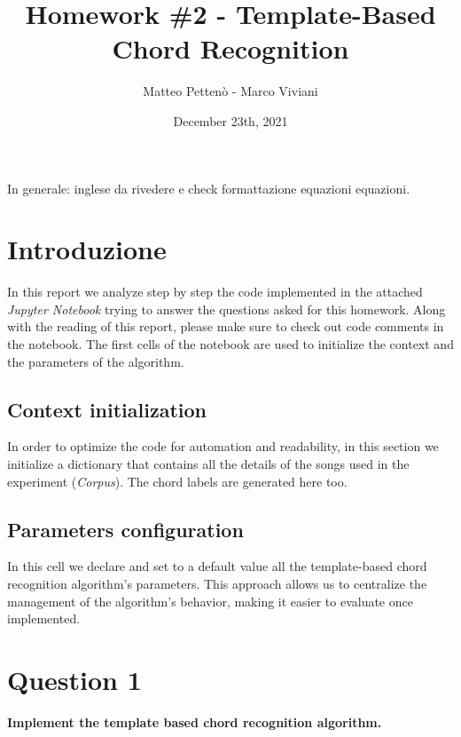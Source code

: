 \documentclass[
	12pt, %
]{fphw}
\title{Homework \#2 - Template-Based Chord Recognition} %
\author{Matteo Pettenò - Marco Viviani} %
\date{December 23th, 2021} %
\institute{Politecnico di Milano} %
\begin{document}
\maketitle %


\color{red}
In generale: inglese da rivedere e check formattazione equazioni equazioni.
\color{black}

\section*{Introduzione}

In this report we analyze step by step the code implemented in the attached \emph{Jupyter Notebook} trying to answer the questions asked for this homework. Along with the reading of this report, please make sure to check out code comments in the notebook. The first cells of the notebook are used to initialize the context and the parameters of the algorithm.

\subsection*{Context initialization}
In order to optimize the code for automation and readability, in this section we initialize a dictionary that contains all the details of the songs used in the experiment (\emph{Corpus}). The chord labels are generated here too.

\subsection*{Parameters configuration}
In this cell we declare and set to a default value all the template-based chord recognition algorithm's parameters. This approach allows us to centralize the management of the algorithm's behavior, making it easier to evaluate once implemented.

\section*{\color{red}Question 1}

\begin{problem}
	\textbf{Implement the template based chord recognition algorithm.}
\end{problem}
\end{document}
